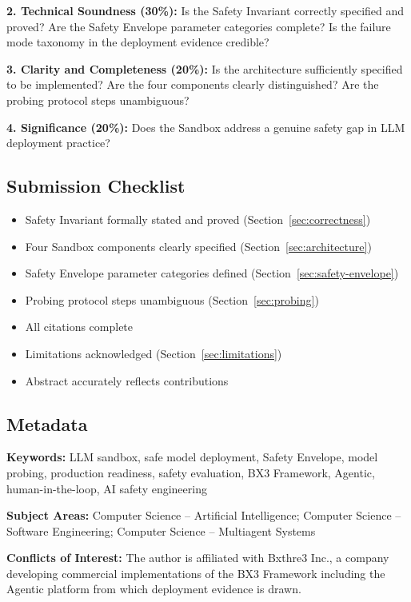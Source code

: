 \documentclass[12pt]{article}
\begin{document}
\textbf{2. Technical Soundness (30\%):} Is the Safety Invariant correctly specified and proved? Are the Safety Envelope parameter categories complete? Is the failure mode taxonomy in the deployment evidence credible?

\textbf{3. Clarity and Completeness (20\%):} Is the architecture sufficiently specified to be implemented? Are the four components clearly distinguished? Are the probing protocol steps unambiguous?

\textbf{4. Significance (20\%):} Does the Sandbox address a genuine safety gap in LLM deployment practice?

\subsection*{Submission Checklist}

\begin{itemize}
    \item[ ] Safety Invariant formally stated and proved (Section~\ref{sec:correctness})
    \item[ ] Four Sandbox components clearly specified (Section~\ref{sec:architecture})
    \item[ ] Safety Envelope parameter categories defined (Section~\ref{sec:safety-envelope})
    \item[ ] Probing protocol steps unambiguous (Section~\ref{sec:probing})
    \item[ ] All citations complete
    \item[ ] Limitations acknowledged (Section~\ref{sec:limitations})
    \item[ ] Abstract accurately reflects contributions
\end{itemize}

\subsection*{Metadata}

\textbf{Keywords:} LLM sandbox, safe model deployment, Safety Envelope, model probing, production readiness, safety evaluation, BX3 Framework, Agentic, human-in-the-loop, AI safety engineering

\textbf{Subject Areas:} Computer Science -- Artificial Intelligence; Computer Science -- Software Engineering; Computer Science -- Multiagent Systems

\textbf{Conflicts of Interest:} The author is affiliated with Bxthre3 Inc., a company developing commercial implementations of the BX3 Framework including the Agentic platform from which deployment evidence is drawn.
\end{document}
